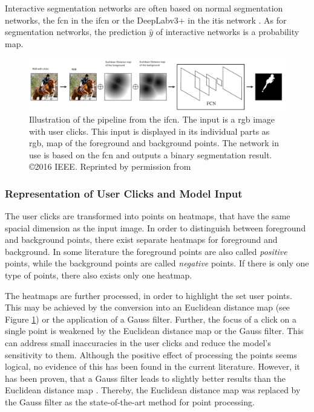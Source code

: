 Interactive segmentation networks are often based on normal segmentation networks, \eg the \gls{fcn} in the \gls{ifcn} \cite{Xu16-InteractiveObjectSelection} or the DeepLabv3+ in the \gls{itis} network \cite{MVL18-ITIS}.
As for segmentation networks, the prediction $\hat{y}$ of interactive networks is a probability map.

\begin{figure} [!b]
	\includegraphics[width=\linewidth]{figures/chap232_ifcn.png}
	\caption[Interactively Fully Convolutional Network]{
		Illustration of the pipeline from the \gls{ifcn}.
		The input is a \gls{rgb} image with user clicks.
		This input is displayed in its individual parts as \gls{rgb}, map of the foreground and background points.
		The network in use is based on the \gls{fcn} and outputs a binary segmentation result.
		\copyright 2016 IEEE. Reprinted by permission from \cite{Xu16-InteractiveObjectSelection}
	}\label{fig:ch2:sec3:ifcn}
\end{figure}

\subsubsection{Representation of User Clicks and Model Input}
The user clicks are transformed into points on heatmaps, that have the same spacial dimension as the input image.
In order to distinguish between foreground and background points, there exist separate heatmaps for foreground and background.
In some literature the foreground points are also called \textit{positive} points, while the background points are called \textit{negative} points.
If there is only one type of points, there also exists only one heatmap.

The heatmaps are further processed, in order to highlight the set user points.
This may be achieved by the conversion into an Euclidean distance map \cite{Dan80-EuclideanDistanceMapping} (see Figure \ref{fig:ch2:sec3:ifcn}) or the application of a Gauss filter.
Further, the focus of a click on a single point is weakened by the Euclidean distance map or the Gauss filter.
This can address small inaccuracies in the user clicks and reduce the model's sensitivity to them.
Although the positive effect of processing the points seems logical, no evidence of this has been found in the current literature.
However, it has been proven, that a Gauss filter leads to slightly better results than the Euclidean distance map \cite{Man18-DEXTR} \cite{MVL18-ITIS}.
Thereby, the Euclidean distance map was replaced by the Gauss filter as the state-of-the-art method for point processing.

